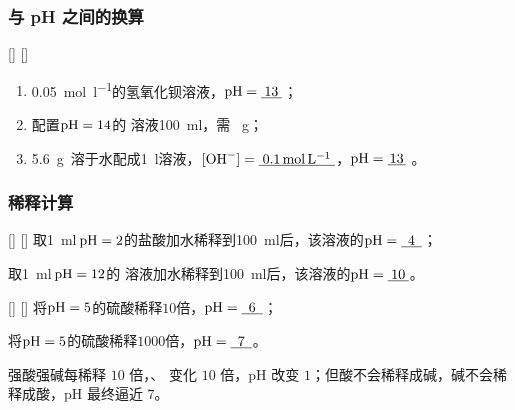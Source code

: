        \subsubsection{\texorpdfstring{\cemh{[OH^-]}}{OH⁻}与 pH 之间的换算}\label{subsubsec:[OH^-]与pH之间的换算}
            \begin{xmp}
                [pH 计算例三]
                {}
                []
                []
                \vspace{-\baselineskip}
                \begin{enumerate}
                    \item \SI{0.05}{\mole\per\litre}的氢氧化钡溶液，\(\cemh{pH}=\uline{\makebox[1.5em]{13}}\)；
                    \item 配置\(\cemh{pH} = 14\)的  溶液\SI{100}{\ml}，需 \uline{}\SI{}{\gram}；
                    \item \SI{5.6}{\gram}\, 溶于水配成\SI{1}{\litre}溶液，\(\cemh{[OH^-]}=\uline{\makebox[5.5em]{\SI{0.1}{\mole\per\litre}}}\)，\(\cemh{pH}=\uline{\makebox[1.3em]{13}}\) 。
                \end{enumerate}
            \end{xmp}
            
        \subsubsection{稀释计算}\label{subsubsec:稀释计算}
            \begin{xmp}
                [pH 计算例四]
                {}
                []
                []
                取\SI{1}{\ml}\,\(\cemh{pH}=2\)的盐酸加水稀释到\SI{100}{\ml}后，该溶液的\(\cemh{pH}=\uline{\makebox[1.5em]{4}}\)；

                取\SI{1}{\ml}\,\(\cemh{pH}=12\)的  溶液加水稀释到\SI{100}{\ml}后，该溶液的\(\cemh{pH}=\uline{\makebox[1.5em]{10}}\)。
            \end{xmp}
            \begin{xmp}
                [pH 计算例五]
                {}
                []
                []
                将\(\cemh{pH}=5\)的硫酸稀释\(10\)倍，\(\cemh{pH}=\uline{\makebox[1.5em]{6}}\)；

                将\(\cemh{pH}=5\)的硫酸稀释\(1000\)倍，\(\cemh{pH}=\uline{\makebox[1.5em]{7}}\)。
            \end{xmp}

            \begin{rmk}
                强酸强碱每稀释 \( 10 \) 倍，\cemh{[H+]}、\cemh{[OH^-]} 变化 \( 10 \) 倍，pH 改变 \( 1 \)；但酸不会稀释成碱，碱不会稀释成酸，pH 最终逼近 \( 7 \)。
            \end{rmk}

